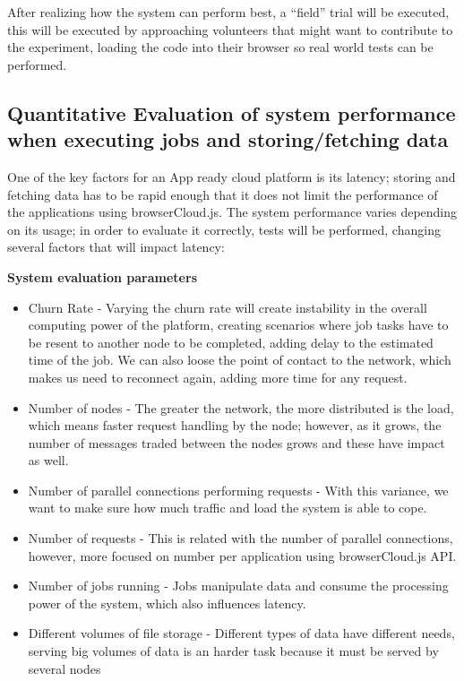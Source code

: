 After realizing how the system can perform best, a ``field'' trial will be executed, this will be executed by approaching volunteers that might want to contribute to the experiment, loading the code into their browser so real world tests can be performed.

\subsection{Quantitative Evaluation of system performance when executing jobs and storing/fetching data}

One of the key factors for an App ready cloud platform is its latency; storing and fetching data has to be rapid enough that it does not limit the performance of the applications using browserCloud.js. The system performance varies depending on its usage; in order to evaluate it correctly, tests will be performed, changing several factors that will impact latency:

\textbf{System evaluation parameters}
\begin{itemize}
  \item Churn Rate - Varying the churn rate will create instability in the overall computing power of the platform, creating scenarios where job tasks have to be resent to another node to be completed, adding delay to the estimated time of the job. We can also loose the point of contact to the network, which makes us need to reconnect again, adding more time for any request.
  \item Number of nodes - The greater the network, the more distributed is the load, which means faster request handling by the node; however, as it grows, the number of messages traded between the nodes grows and these have impact as well. 
  \item Number of parallel connections performing requests - With this variance, we want to make sure how much traffic and load the system is able to cope.
  \item Number of requests - This is related with the number of parallel connections, however, more focused on number per application using browserCloud.js API.
  \item Number of jobs running - Jobs manipulate data and consume the processing power of the system, which also influences latency.
  \item Different volumes of file storage - Different types of data have different needs, serving big volumes of data is an harder task because it must be served by several nodes
\end{itemize}

